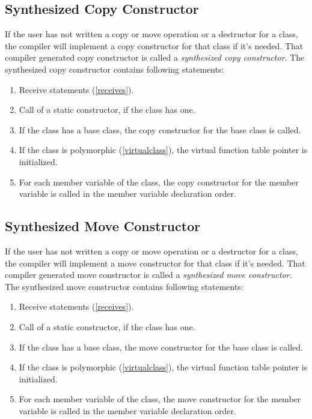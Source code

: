 \documentclass[a4paper,oneside,11pt]{book}
\theoremstyle{definition}
\begin{document}
\subsection{Synthesized Copy Constructor}

If the user has not written a copy or move operation or a destructor for a class, the compiler will implement a copy constructor for that class if it's needed.
That compiler generated copy constructor is called a \emph{synthesized copy constructor}.
The synthesized copy constructor contains following statements:
\begin{enumerate}
\item
Receive statements (\ref{receives}).
\item
Call of a static constructor, if the class has one.
\item
If the class has a base class, the copy constructor for the base class is called.
\item
If the class is polymorphic (\ref{virtualclass}), the virtual function table pointer is initialized.
\item
For each member variable of the class, the copy constructor for the member variable is called in the member variable declaration order.
\end{enumerate}

\subsection{Synthesized Move Constructor}

If the user has not written a copy or move operation or a destructor for a class, the compiler will implement a move constructor for that class if it's needed.
That compiler generated move constructor is called a \emph{synthesized move constructor}.
The synthesized move constructor contains following statements:
\begin{enumerate}
\item
Receive statements (\ref{receives}).
\item
Call of a static constructor, if the class has one.
\item
If the class has a base class, the move constructor for the base class is called.
\item
If the class is polymorphic (\ref{virtualclass}), the virtual function table pointer is initialized.
\item
For each member variable of the class, the move constructor for the member variable is called in the member variable declaration order.
\end{enumerate}
\end{document}
